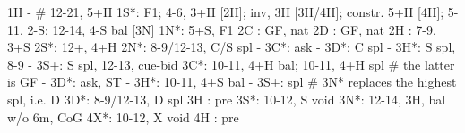 1H -  # 12-21, 5+H
1S*: F1; 4-6, 3+H [2H]; inv, 3H [3H/4H]; constr. 5+H [4H]; 5-11, 2-S; 12-14, 4-S bal [3N]
1N*: 5+S, F1
2C : GF, nat
2D : GF, nat
2H : 7-9, 3+S
2S*: 12+, 4+H
2N*: 8-9/12-13, C/S spl
   - 3C*: ask
        - 3D*: C spl
        - 3H*: S spl, 8-9
        - 3S+: S spl, 12-13, cue-bid
3C*: 10-11, 4+H bal; 10-11, 4+H spl  # the latter is GF
   - 3D*: ask, ST
        - 3H*: 10-11, 4+S bal
        - 3S+: spl  # 3N* replaces the highest spl, i.e. D
3D*: 8-9/12-13, D spl
3H : pre
3S*: 10-12, S void
3N*: 12-14, 3H, bal w/o 6m, CoG
4X*: 10-12, X void
4H : pre